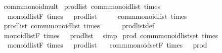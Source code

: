 \begin{isabellebody}
%
\endisatagproof
{\isafoldproof}%
%
\isadelimproof
%
\endisadelimproof
\isanewline
\isanewline
{}\isamarkupfalse%
\isanewline
\isanewline
{}\isamarkupfalse%
\ comm{\isacharunderscore}{\kern0pt}monoid{\isacharunderscore}{\kern0pt}mult\isanewline
{}\isanewline
\isanewline
{}\isamarkupfalse%
\ prod{\isacharunderscore}{\kern0pt}list{\isacharcolon}{\kern0pt}\ comm{\isacharunderscore}{\kern0pt}monoid{\isacharunderscore}{\kern0pt}list\ times\ {}\isanewline
{}\isanewline
\ \ {\isachardoublequoteopen}monoid{\isacharunderscore}{\kern0pt}list{\isachardot}{\kern0pt}F\ times\ {}\ {\isacharequal}{\kern0pt}\ prod{\isacharunderscore}{\kern0pt}list{\isachardoublequoteclose}\isanewline
%
\isadelimproof
%
\endisadelimproof
%
\isatagproof
{}\isamarkupfalse%
\ {\isacharminus}{\kern0pt}\isanewline
\ \ \isamarkupfalse%
\ {\isachardoublequoteopen}comm{\isacharunderscore}{\kern0pt}monoid{\isacharunderscore}{\kern0pt}list\ times\ {}{\isachardoublequoteclose}\ \isacommand{{\isachardot}{\kern0pt}{\isachardot}{\kern0pt}}\isamarkupfalse%
\isanewline
\ \ \isamarkupfalse%
\ \isamarkupfalse%
\ prod{\isacharunderscore}{\kern0pt}list{\isacharcolon}{\kern0pt}\ comm{\isacharunderscore}{\kern0pt}monoid{\isacharunderscore}{\kern0pt}list\ times\ {}\ \isacommand{{\isachardot}{\kern0pt}}\isamarkupfalse%
\isanewline
\ \ \isamarkupfalse%
\ prod{\isacharunderscore}{\kern0pt}list{\isacharunderscore}{\kern0pt}def\ \isamarkupfalse%
\ {\isachardoublequoteopen}monoid{\isacharunderscore}{\kern0pt}list{\isachardot}{\kern0pt}F\ times\ {}\ {\isacharequal}{\kern0pt}\ prod{\isacharunderscore}{\kern0pt}list{\isachardoublequoteclose}\ \isamarkupfalse%
\ simp\isanewline
{}\isamarkupfalse%
%
\endisatagproof
{\isafoldproof}%
%
\isadelimproof
\isanewline
%
\endisadelimproof
\isanewline
{}\isamarkupfalse%
\ prod{\isacharcolon}{\kern0pt}\ comm{\isacharunderscore}{\kern0pt}monoid{\isacharunderscore}{\kern0pt}list{\isacharunderscore}{\kern0pt}set\ times\ {}\isanewline
{}\isanewline
\ \ {\isachardoublequoteopen}monoid{\isacharunderscore}{\kern0pt}list{\isachardot}{\kern0pt}F\ times\ {}\ {\isacharequal}{\kern0pt}\ prod{\isacharunderscore}{\kern0pt}list{\isachardoublequoteclose}\isanewline
\ \ \ {\isachardoublequoteopen}comm{\isacharunderscore}{\kern0pt}monoid{\isacharunderscore}{\kern0pt}set{\isachardot}{\kern0pt}F\ times\ {}\ {\isacharequal}{\kern0pt}\ prod{\isachardoublequoteclose}\isanewline

\end{isabellebody}
